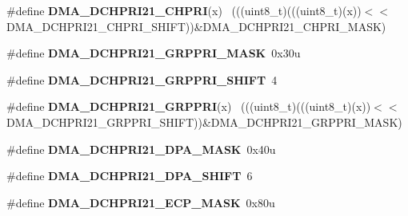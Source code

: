 \begin{DoxyCompactItemize}
\item 
\hypertarget{group___d_m_a___register___masks_ga77aa803948afc0c877e691807db54f4e}{}\#define {\bfseries D\+M\+A\+\_\+\+D\+C\+H\+P\+R\+I21\+\_\+\+C\+H\+P\+R\+I}(x)                                    ~(((uint8\+\_\+t)(((uint8\+\_\+t)(x))$<$$<$D\+M\+A\+\_\+\+D\+C\+H\+P\+R\+I21\+\_\+\+C\+H\+P\+R\+I\+\_\+\+S\+H\+I\+F\+T))\&D\+M\+A\+\_\+\+D\+C\+H\+P\+R\+I21\+\_\+\+C\+H\+P\+R\+I\+\_\+\+M\+A\+S\+K)\label{group___d_m_a___register___masks_ga77aa803948afc0c877e691807db54f4e}

\item 
\hypertarget{group___d_m_a___register___masks_ga8b7fb8fafa0dd0753c17627ab18612d5}{}\#define {\bfseries D\+M\+A\+\_\+\+D\+C\+H\+P\+R\+I21\+\_\+\+G\+R\+P\+P\+R\+I\+\_\+\+M\+A\+S\+K}~0x30u\label{group___d_m_a___register___masks_ga8b7fb8fafa0dd0753c17627ab18612d5}

\item 
\hypertarget{group___d_m_a___register___masks_ga7cd1b0903b98f1810ef30bbb700c95cb}{}\#define {\bfseries D\+M\+A\+\_\+\+D\+C\+H\+P\+R\+I21\+\_\+\+G\+R\+P\+P\+R\+I\+\_\+\+S\+H\+I\+F\+T}~4\label{group___d_m_a___register___masks_ga7cd1b0903b98f1810ef30bbb700c95cb}

\item 
\hypertarget{group___d_m_a___register___masks_ga3f7ad1afed7bff465d568264042736a5}{}\#define {\bfseries D\+M\+A\+\_\+\+D\+C\+H\+P\+R\+I21\+\_\+\+G\+R\+P\+P\+R\+I}(x)                                  ~(((uint8\+\_\+t)(((uint8\+\_\+t)(x))$<$$<$D\+M\+A\+\_\+\+D\+C\+H\+P\+R\+I21\+\_\+\+G\+R\+P\+P\+R\+I\+\_\+\+S\+H\+I\+F\+T))\&D\+M\+A\+\_\+\+D\+C\+H\+P\+R\+I21\+\_\+\+G\+R\+P\+P\+R\+I\+\_\+\+M\+A\+S\+K)\label{group___d_m_a___register___masks_ga3f7ad1afed7bff465d568264042736a5}

\item 
\hypertarget{group___d_m_a___register___masks_ga92fa1471830bd86192aff0553eeee393}{}\#define {\bfseries D\+M\+A\+\_\+\+D\+C\+H\+P\+R\+I21\+\_\+\+D\+P\+A\+\_\+\+M\+A\+S\+K}~0x40u\label{group___d_m_a___register___masks_ga92fa1471830bd86192aff0553eeee393}

\item 
\hypertarget{group___d_m_a___register___masks_ga36648f5b8354ee0b7fef1ddb43b1f963}{}\#define {\bfseries D\+M\+A\+\_\+\+D\+C\+H\+P\+R\+I21\+\_\+\+D\+P\+A\+\_\+\+S\+H\+I\+F\+T}~6\label{group___d_m_a___register___masks_ga36648f5b8354ee0b7fef1ddb43b1f963}

\item 
\hypertarget{group___d_m_a___register___masks_gad102468b77c4b86b9357bb6af4b982e7}{}\#define {\bfseries D\+M\+A\+\_\+\+D\+C\+H\+P\+R\+I21\+\_\+\+E\+C\+P\+\_\+\+M\+A\+S\+K}~0x80u\label{group___d_m_a___register___masks_gad102468b77c4b86b9357bb6af4b982e7}


\end{DoxyCompactItemize}
